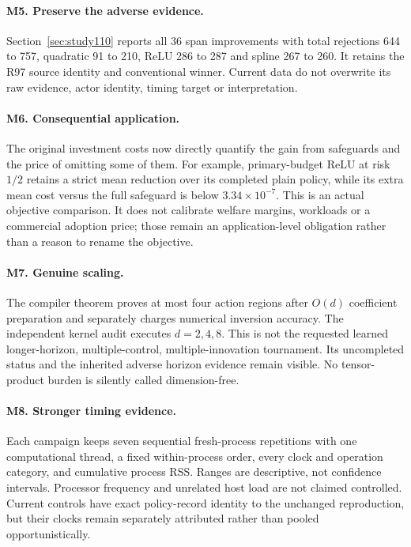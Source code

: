 \documentclass[11pt]{article}
\begin{document}
\paragraph{M5. Preserve the adverse evidence.}
Section~\ref{sec:study110} reports all 36 span improvements with total rejections 644 to 757, quadratic 91 to 210, ReLU 286 to 287 and spline 267 to 260. It retains the R97 source identity and conventional winner. Current data do not overwrite its raw evidence, actor identity, timing target or interpretation.

\paragraph{M6. Consequential application.}
The original investment costs now directly quantify the gain from safeguards and the price of omitting some of them. For example, primary-budget ReLU at risk $1/2$ retains a strict mean reduction over its completed plain policy, while its extra mean cost versus the full safeguard is below $3.34\times10^{-7}$. This is an actual objective comparison. It does not calibrate welfare margins, workloads or a commercial adoption price; those remain an application-level obligation rather than a reason to rename the objective.

\paragraph{M7. Genuine scaling.}
The compiler theorem proves at most four action regions after $O(d)$ coefficient preparation and separately charges numerical inversion accuracy. The independent kernel audit executes $d=2,4,8$. This is not the requested learned longer-horizon, multiple-control, multiple-innovation tournament. Its uncompleted status and the inherited adverse horizon evidence remain visible. No tensor-product burden is silently called dimension-free.

\paragraph{M8. Stronger timing evidence.}
Each campaign keeps seven sequential fresh-process repetitions with one computational thread, a fixed within-process order, every clock and operation category, and cumulative process RSS. Ranges are descriptive, not confidence intervals. Processor frequency and unrelated host load are not claimed controlled. Current controls have exact policy-record identity to the unchanged reproduction, but their clocks remain separately attributed rather than pooled opportunistically.
\end{document}
